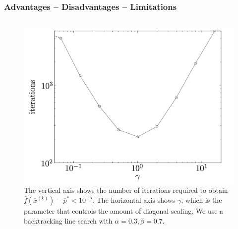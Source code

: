 \begin{frame}
  \frametitle{Advantages -- Disadvantages -- Limitations}




\vspace{-4mm}


\begin{columns}
  \begin{column}{0.5\textwidth}
    \begin{figure}[ht!]
      \centering
\includegraphics[scale=0.15]{pics/ga1.png}
\caption{\tiny The
  vertical axis shows the number of iterations required to obtain
  $\overline{f}(\overline{x}^{(k)}) - \overline{p}^* < 10^{-5}$. The
  horizontal axis shows $\gamma$, which is the  parameter that controls the amount of diagonal scaling. We use a
backtracking line search with $\alpha = 0.3, \beta = 0.7$.}
    \end{figure}
  \end{column}


\end{columns}
\end{frame}
